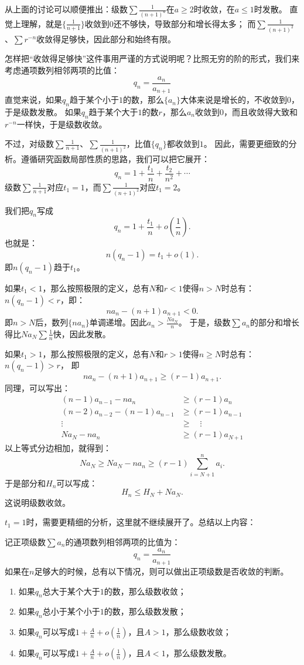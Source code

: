 \documentclass[12pt,UTF8]{ctexbook}
\newcommand{\olim}[1]{\mathit{o}\left(#1\right)}  %
\theoremstyle{definition}
\theoremstyle{plain}
\begin{document}
从上面的讨论可以顺便推出：级数$\sum \frac{1}{(n+1)^a}$在$a\geqslant 2$时收敛，在$a\leqslant 1$时发散。
直觉上理解，就是$\{\frac{1}{n+1}\}$收敛到$0$还不够快，导致部分和增长得太多；
而$\sum \frac{1}{(n+1)^2}$、$\sum r^{-n}$收敛得足够快，因此部分和始终有限。

怎样把“收敛得足够快”这件事用严谨的方式说明呢？比照无穷的阶的形式，我们来考虑通项数列相邻两项的比值：
$$ q_n = \frac{a_n}{a_{n+1}} $$
直觉来说，如果$q_n$趋于某个小于$1$的数，那么$\{a_n\}$大体来说是增长的，不收敛到$0$，于是级数发散。
如果$q_n$趋于某个大于$1$的数$r$，那么$a_n$收敛到$0$，而且收敛得大致和$r^{-n}$一样快，于是级数收敛。

不过，对级数$\sum \frac{1}{n+1}$、$\sum \frac{1}{(n+1)^2}$，比值$\{q_n\}$都收敛到$1$。
因此，需要更细致的分析。遵循研究函数局部性质的思路，我们可以把它展开：
$$ q_n = 1 + \frac{t_1}{n} + \frac{t_2}{n^2} + \cdots $$
级数$\sum \frac{1}{n+1}$对应$t_1 = 1$，而$\sum \frac{1}{(n+1)^2}$对应$t_1 = 2$。

我们把$q_n$写成
$$ q_n = 1 + \frac{t_1}{n} + \olim{\frac{1}{n}}. $$
也就是：
$$ n(q_n - 1) = t_1 + \olim{1}.$$
即$n(q_n - 1)$趋于$t_1$。

如果$t_1 < 1$，那么按照极限的定义，总有$N$和$r<1$使得$n>N$时总有：$n(q_n - 1) < r$，即：
$$ na_n - (n+1)a_{n+1} < 0. $$
即$n>N$后，数列$\{na_n\}$单调递增。因此$a_n > \frac{Na_N}{n}$。
于是，级数$\sum a_n$的部分和增长得比$Na_N\sum \frac{1}{n}$快，因此发散。

如果$t_1 > 1$，那么按照极限的定义，总有$N$和$r>1$使得$n\geqslant N$时总有：$n(q_n - 1) > r$，
即
$$ na_n - (n+1)a_{n+1} \geqslant (r - 1)a_{n+1}.  $$
同理，可以写出：
\begin{align*}
    (n-1)a_{n-1} - na_n &\geqslant (r - 1)a_{n}  \\
    (n-2)a_{n-2} - (n-1)a_{n-1} &\geqslant (r - 1)a_{n-1}  \\
    \vdots \quad &\geqslant \quad \vdots  \\
    Na_{N} - na_n &\geqslant (r - 1)a_{N+1} 
\end{align*}
以上等式分边相加，就得到：
$$ Na_{N} \geqslant Na_{N} - na_n \geqslant (r - 1)\sum_{i=N+1}^n a_i. $$
于是部分和$H_n$可以写成：
$$ H_n \leqslant H_N + Na_{N}.$$
这说明级数收敛。

$t_1 = 1$时，需要更精细的分析，这里就不继续展开了。总结以上内容：

记正项级数$\sum a_n$的通项数列相邻两项的比值为：
$$ q_n = \frac{a_n}{a_{n+1}} $$
如果在$n$足够大的时候，总有以下情况，则可以做出正项级数是否收敛的判断。
\begin{enumerate}
    \item 如果$q_n$总大于某个大于$1$的数，那么级数收敛；
    \item 如果$q_n$总小于某个小于$1$的数，那么级数发散；
    \item 如果$q_n$可以写成$1 + \frac{A}{n} + \olim{\frac{1}{n}}$，且$A > 1$，那么级数收敛；
    \item 如果$q_n$可以写成$1 + \frac{A}{n} + \olim{\frac{1}{n}}$，且$A < 1$，那么级数发散。
\end{enumerate}
\end{document}
